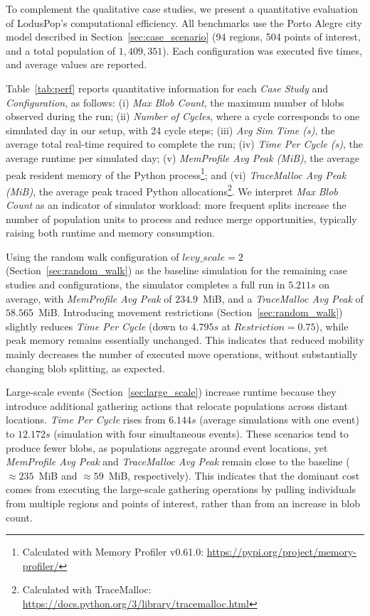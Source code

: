 \documentclass[pdflatex,sn-mathphys-num]{sn-jnl}%
\newcommand\redc[1]{#1}
\theoremstyle{thmstyleone}%
\theoremstyle{thmstyletwo}%
\theoremstyle{thmstylethree}%
\begin{document}
\redc{To complement the qualitative case studies, we present a quantitative evaluation of LodusPop’s computational efficiency. All benchmarks use the Porto Alegre city model described in Section~\ref{sec:case_scenario} (94 regions, 504 points of interest, and a total population of $1,409,351$). Each configuration was executed five times, and average values are reported.

Table~\ref{tab:perf} reports quantitative information for each \textit{Case Study} and \textit{Configuration}, as follows: (i) \textit{Max Blob Count}, the maximum number of blobs observed during the run; (ii) \textit{Number of Cycles}, where a cycle corresponds to one simulated day in our setup, with 24 cycle steps; (iii) \textit{Avg Sim Time (s)}, the average total real-time required to complete the run; (iv) \textit{Time Per Cycle (s)}, the average runtime per simulated day; (v) \textit{MemProfile Avg Peak (MiB)}, the average peak resident memory of the Python process\footnote{Calculated with Memory Profiler v0.61.0: \url{https://pypi.org/project/memory-profiler/}}; and (vi) \textit{TraceMalloc Avg Peak (MiB)}, the average peak traced Python allocations\footnote{Calculated with TraceMalloc: \url{https://docs.python.org/3/library/tracemalloc.html}}. We interpret \textit{Max Blob Count} as an indicator of simulator workload: more frequent splits increase the number of population units to process and reduce merge opportunities, typically raising both runtime and memory consumption.

Using the random walk configuration of $levy\_scale=2$ (Section~\ref{sec:random_walk}) as the baseline simulation for the remaining case studies and configurations, the simulator completes a full run in $5.211s$ on average, with \emph{MemProfile Avg Peak} of $234.9$~MiB, and a \textit{TraceMalloc Avg Peak} of $58.565$~MiB. Introducing movement restrictions (Section~\ref{sec:random_walk}) slightly reduces \textit{Time Per Cycle} (down to $4.795s$ at $Restriction =0.75$), while peak memory remains essentially unchanged. This indicates that reduced mobility mainly decreases the number of executed move operations, without substantially changing blob splitting, as expected.

Large-scale events (Section~\ref{sec:large_scale}) increase runtime because they introduce additional gathering actions that relocate populations across distant locations. \textit{Time Per Cycle} rises from $6.144s$ (average simulations with one event) to $12.172s$ (simulation with four simultaneous events). These scenarios tend to produce fewer blobs, as populations aggregate around event locations, yet \textit{MemProfile Avg Peak} and \textit{TraceMalloc Avg Peak} remain close to the baseline ($\approx 235$~MiB and $\approx 59$~MiB, respectively). This indicates that the dominant cost comes from executing the large-scale gathering operations by pulling individuals from multiple regions and points of interest, rather than from an increase in blob count.

}
\end{document}
